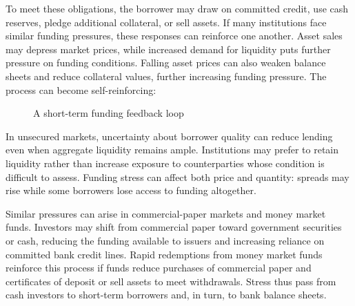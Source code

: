 To meet these obligations, the borrower may draw on
committed credit, use cash reserves, pledge additional
collateral, or sell assets. If many institutions face
similar funding pressures, these responses can reinforce
one another. Asset sales may depress market prices,
while increased demand for liquidity puts further
pressure on funding conditions. Falling asset prices
can also weaken balance sheets and reduce collateral
values, further increasing funding pressure. The process
can become self-reinforcing:


\begin{figure}[H]
\centering
{}
\caption{A short-term funding feedback loop}
\label{fig:ch7-funding-run-loop}
\end{figure}

In unsecured markets, uncertainty about borrower quality can reduce lending even when aggregate liquidity remains ample. Institutions may prefer to retain liquidity rather than increase exposure to counterparties whose condition is difficult to assess. Funding stress can affect both price and quantity: spreads may rise while some borrowers lose access to funding altogether.

Similar pressures can arise in commercial-paper markets and money market funds. Investors may shift from commercial paper toward government securities or cash, reducing the funding available to issuers and increasing reliance on committed bank credit lines. Rapid redemptions from money market funds reinforce this process if funds reduce purchases of commercial paper and certificates of deposit or sell assets to meet withdrawals. Stress thus pass from cash investors to short-term borrowers and, in turn, to bank balance sheets.

